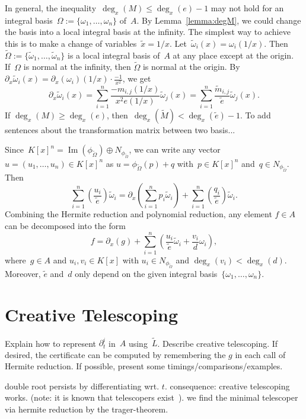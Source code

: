 \documentclass{sig-alternate}
\newcommand{\red}{\color{red}}
\def\im{\operatorname{Im}}
\begin{document}
In general, the inequality~$\deg_x(M)\leq \deg_x(e)-1$ may not hold
for an integral basis~$\Omega := \{\omega_1, \ldots, \omega_n\}$ of~$A$. By Lemma~\ref{lemma:degM}, we could
change the basis into a local integral basis at the infinity. The simplest
way to achieve this is to make a change of variables~$\tilde x = 1/x$.
Let~$\tilde \omega_i(x) = \omega_i(1/x)$. Then $\tilde \Omega := \{\tilde \omega_1, \ldots, \tilde \omega_n\}$
is a local integral basis of~$A$ at any place except at the origin. If~$\Omega$
is normal at the infinity, then $\tilde \Omega$ is normal at the origin.
By $\partial_x \tilde \omega_i(x) = \partial_x(\omega_i)(1/x)\cdot \frac{-1}{x^2} $, we get
\[\partial_x \tilde \omega_i(x) = \sum_{i=1}^n\frac{-m_{i, j}(1/x)}{x^2e(1/x)}  \tilde \omega_j(x) = \sum_{i=1}^n \frac{\tilde m_{i, j}}{\tilde e}  \tilde \omega_j(x) .\]
If $\deg_x(M) \geq \deg_x(e)$, then~$\deg_x(\tilde M)<\deg_x(\tilde e)-1$.
{\red To add sentences about the transformation matrix between two basis... }

Since~$K[x]^n = \im(\phi_{\tilde \Omega}) \oplus N_{\phi_{\tilde \Omega}}$,
we can write any vector~$u = (u_1, \ldots, u_n)\in K[x]^n$
as $u = \phi_{\tilde \Omega}(p) + q$ with~$p\in K[x]^n$ and~$q\in N_{\phi_{\tilde \Omega}}$. Then
\[\sum_{i=1}^n \left(\frac{u_i}{\tilde e}\right){\tilde \omega}_i = \partial_x\left(\sum_{i=1}^n p_i {\tilde \omega}_i\right)
+ \sum_{i=1}^n \left(\frac{q_i}{\tilde e}\right){\tilde \omega}_i.\]
Combining the Hermite reduction and polynomial reduction, any element $f\in A$ can be
decomposed into the form
\[f = \partial_x(g) +  \sum_{i=1}^n \left(\frac{u_i}{\tilde e}\tilde \omega_i + \frac{v_i}{d}\omega_i\right),\]
where~$g\in A$ and $u_i, v_i\in K[x]$ with $u_i \in N_{\phi_{\tilde \Omega}}$ and $\deg_x(v_i) < \deg_x(d)$.
Moreover, $\tilde e$ and~$d$ only depend on the given integral basis~$\{\omega_1, \ldots, \omega_n\}$.

\section{Creative Telescoping}

Explain how to represent $\partial_t^i$ in~$A$ using~$\tilde{L}$.
Describe creative telescoping.
If desired, the certificate can be computed by remembering the $g$ in each call of Hermite reduction.
If possible, present some timings/comparisons/examples.

double root persists by differentiating wrt. $t$. consequence: creative telescoping works.
(note: it is known that telescopers exist~\cite{zeilberger90,chyzak00}).
we find the minimal telescoper via hermite reduction by the trager-theorem.
\end{document}
